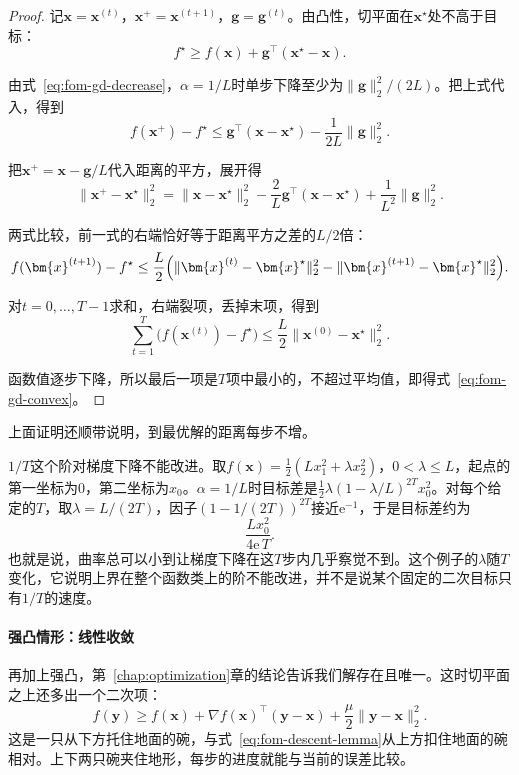 \begin{proof}
记$\bm{x}=\bm{x}^{(t)}$，$\bm{x}^+=\bm{x}^{(t+1)}$，$\bm{g}=\bm{g}^{(t)}$。由凸性，切平面在$\bm{x}^\star$处不高于目标：
\[
 f^\star\geq f(\bm{x})+\bm{g}^\top(\bm{x}^\star-\bm{x}).
\]

由式~\eqref{eq:fom-gd-decrease}，$\alpha=1/L$时单步下降至少为$\lVert\bm{g}\rVert_2^2/(2L)$。把上式代入，得到
\[
 f(\bm{x}^+)-f^\star\leq\bm{g}^\top(\bm{x}-\bm{x}^\star)-\frac{1}{2L}\lVert\bm{g}\rVert_2^2.
\]

把$\bm{x}^+=\bm{x}-\bm{g}/L$代入距离的平方，展开得
\[
 \lVert\bm{x}^+-\bm{x}^\star\rVert_2^2
 =\lVert\bm{x}-\bm{x}^\star\rVert_2^2-\frac2L\bm{g}^\top(\bm{x}-\bm{x}^\star)+\frac{1}{L^2}\lVert\bm{g}\rVert_2^2.
\]

两式比较，前一式的右端恰好等于距离平方之差的$L/2$倍：
\[
 f(\bm{x}^{(t+1)})-f^\star\leq\frac L2\Bigl(\lVert\bm{x}^{(t)}-\bm{x}^\star\rVert_2^2-\lVert\bm{x}^{(t+1)}-\bm{x}^\star\rVert_2^2\Bigr).
\]

对$t=0,\ldots,T-1$求和，右端裂项，丢掉末项，得到
\[
 \sum_{t=1}^{T}\bigl(f(\bm{x}^{(t)})-f^\star\bigr)\leq\frac L2\lVert\bm{x}^{(0)}-\bm{x}^\star\rVert_2^2.
\]

函数值逐步下降，所以最后一项是$T$项中最小的，不超过平均值，即得式~\eqref{eq:fom-gd-convex}。
\end{proof}

上面证明还顺带说明，到最优解的距离每步不增。

$1/T$这个阶对梯度下降不能改进。取$f(\bm{x})=\tfrac12(Lx_1^2+\lambda x_2^2)$，$0<\lambda\leq L$，起点的第一坐标为$0$，第二坐标为$x_0$。$\alpha=1/L$时目标差是$\tfrac12\lambda(1-\lambda/L)^{2T}x_0^2$。对每个给定的$T$，取$\lambda=L/(2T)$，因子$(1-1/(2T))^{2T}$接近$\mathrm{e}^{-1}$，于是目标差约为
\[
 \frac{Lx_0^2}{4\mathrm{e}\,T}.
\]
也就是说，曲率总可以小到让梯度下降在这$T$步内几乎察觉不到。这个例子的$\lambda$随$T$变化，它说明上界在整个函数类上的阶不能改进，并不是说某个固定的二次目标只有$1/T$的速度。

\paragraph{强凸情形：线性收敛}
再加上强凸，第~\ref{chap:optimization}章的结论告诉我们解存在且唯一。这时切平面之上还多出一个二次项：
\begin{equation}
 f(\bm{y})\geq f(\bm{x})+\nabla f(\bm{x})^\top(\bm{y}-\bm{x})+\frac\mu2\lVert\bm{y}-\bm{x}\rVert_2^2.
 \label{eq:fom-strong-convexity}
\end{equation}
这是一只从下方托住地面的碗，与式~\eqref{eq:fom-descent-lemma}从上方扣住地面的碗相对。上下两只碗夹住地形，每步的进度就能与当前的误差比较。

